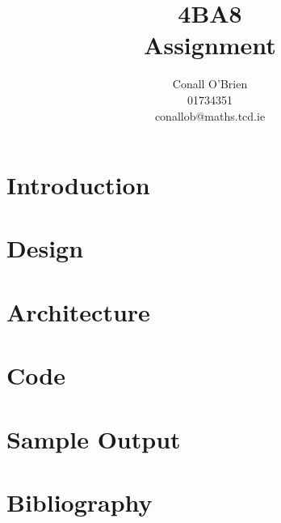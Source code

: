 \documentclass[a4paper,12pt]{article}
\begin{document}
\title{4BA8 \\ Assignment}

\author{Conall O'Brien \\ 01734351 \\ conallob@maths.tcd.ie}

\maketitle

\section{Introduction}

\section{Design}

\section{Architecture}

\section{Code}

\section{Sample Output}

\section{Bibliography}
\end{document}
